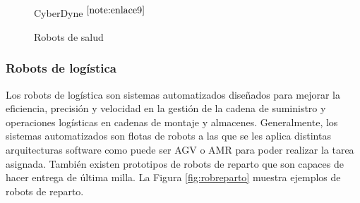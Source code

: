 \begin{figure}[ht!]
\begin{minipage}{0.25\linewidth}
    	\caption*{\centering CyberDyne $^{\ref{note:enlace9}}$}
    \end{minipage}
	\caption{Robots de salud}
	\label{fig:robsalud}
\end{figure}


\setcounter{footnote}{11} %

\setcounter{footnote}{12} %

\setcounter{footnote}{13} %

\setcounter{footnote}{14} %

\subsubsection{Robots de logística}

Los robots de logística son sistemas automatizados diseñados para mejorar la eficiencia, precisión y velocidad en la gestión de la cadena de suministro y operaciones logísticas en cadenas de montaje y almacenes. Generalmente, los sistemas automatizados son flotas de robots a las que se les aplica distintas arquitecturas software como puede ser \acs{AGV} o \acs{AMR} para poder realizar la tarea asignada. También existen prototipos de robots de reparto que son capaces de hacer entrega de última milla. La Figura \ref{fig:robreparto}  muestra ejemplos de robots de reparto. 

